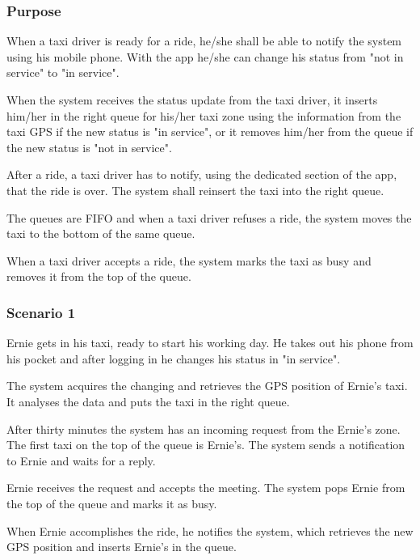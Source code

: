 \label{taxi-availability}
\subsubsection{Purpose}

When a taxi driver is ready for a ride, he/she shall be able to notify the system using his mobile phone. With the app he/she can change his status from "not in service" to "in service".

When the system receives the status update from the taxi driver, it inserts him/her in the right queue for his/her taxi zone using the information from the taxi GPS if the new status is "in service", or it removes him/her from the queue if the new status is "not in service".

After a ride, a taxi driver has to notify, using the dedicated section of the app, that the ride is over. The system shall reinsert the taxi into the right queue.

The queues are FIFO and when a taxi driver refuses a ride, the system moves the taxi to the bottom of the same queue.

When a taxi driver accepts a ride, the system marks the taxi as busy and removes it from the top of the queue.

\subsubsection{Scenario 1}
Ernie gets in his taxi, ready to start his working day. He takes out his phone from his pocket and after logging in he changes his status in "in service".

The system acquires the changing and retrieves the GPS position of Ernie's taxi. It analyses the data and puts the taxi in the right queue.

After thirty minutes the system has an incoming request from the Ernie's zone. The first taxi on the top of the queue is Ernie's. The system sends a notification to Ernie and waits for a reply.

Ernie receives the request and accepts the meeting. The system pops Ernie from the top of the queue and marks it as busy.

When Ernie accomplishes the ride, he notifies the system, which retrieves the new GPS position and inserts Ernie's in the queue.

